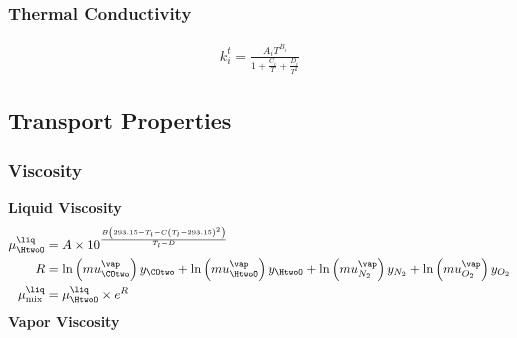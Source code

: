             \subsubsection{Thermal Conductivity}
                \begin{align}
                    k^{t}_{i} = \frac{A_i T^{B_i}}{1 + \frac{C_i}{T} + \frac{D_i}{T^2}}
                \end{align}

        \newpage
        \subsection{Transport Properties}
            \subsubsection{Viscosity} \cite{Morgan2015}
                \textbf{Liquid Viscosity}
                \begin{align}
                    \mu ^{\liq}_{\HtwoO} &= A \times 10^\frac{B\left(293.15 - T_l - C\left(T_l - 293.15\right)^2\right)}{T_l - D} \\
                    R &= \ln\left(mu^{\vap}_{\COtwo}\right) y_{\COtwo}+\ln\left(mu^{\vap}_{\HtwoO}\right) y_{\HtwoO}+\ln\left(mu^{\vap}_{N_2}\right) y_{N_2}+\ln\left(mu^{\vap}_{O_2}\right) y_{O_2} \\
                    \mu ^{\liq}_{\text{mix}} &= \mu ^{\liq}_{\HtwoO} \times e^{R}
                \end{align}
                \vspace{.5cm}
                \textbf{Vapor Viscosity}
